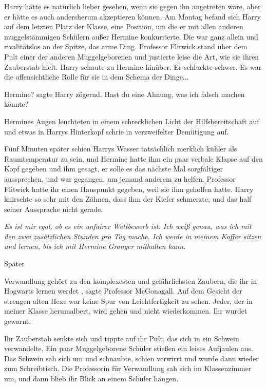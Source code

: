 Harry hätte es natürlich lieber gesehen, wenn sie gegen ihn angetreten wäre,
aber er hätte es auch andersherum akzeptieren können. Am Montag befand sich
Harry auf dem letzten Platz der Klasse, eine Position, um die er mit allen
anderen muggelstämmigen Schülern außer Hermine konkurrierte. Die war ganz allein
und rivalitätslos an der Spitze, das arme Ding. Professor Flitwick stand über
dem Pult einer der anderen Muggelgeborenen und justierte leise die Art, wie sie
ihren Zauberstab hielt. Harry schaute zu Hermine hinüber. Er schluckte schwer.
Es war die offensichtliche Rolle für sie in dem Schema der Dinge...

\glqq Hermine?\grqq{} sagte Harry zögernd. \glqq Hast du eine Ahnung, was ich
falsch machen könnte?\grqq{}

Hermines Augen leuchteten in einem schrecklichen Licht der Hilfsbereitschaft auf
und etwas in Harrys Hinterkopf schrie in verzweifelter Demütigung auf.

Fünf Minuten später schien Harrys Wasser tatsächlich merklich kühler als
Raumtemperatur zu sein, und Hermine hatte ihm ein paar verbale Klapse auf den
Kopf gegeben und ihm gesagt, er solle es das nächste Mal sorgfältiger
aussprechen, und war gegangen, um jemand anderem zu helfen. Professor Flitwick
hatte ihr einen Hauspunkt gegeben, weil sie ihm geholfen hatte. Harry knirschte
so sehr mit den Zähnen, dass ihm der Kiefer schmerzte, und das half seiner
Aussprache nicht gerade.

\emph{ Es ist mir egal, ob es ein unfairer Wettbewerb ist. Ich weiß genau, was
ich mit den zwei zusätzlichen Stunden pro Tag mache. Ich werde in meinem Koffer
sitzen und lernen, bis ich mit Hermine Granger mithalten kann. }

Später

\glqq Verwandlung gehört zu den komplexesten und gefährlichsten Zaubern, die ihr
in Hogwarts lernen werdet\grqq{} , sagte Professor McGonagall. Auf dem Gesicht
der strengen alten Hexe war keine Spur von Leichtfertigkeit zu sehen. \glqq
Jeder, der in meiner Klasse herumalbert, wird gehen und nicht wiederkommen. Ihr
wurdet gewarnt.\grqq{}

Ihr Zauberstab senkte sich und tippte auf ihr Pult, das sich in ein Schwein
verwandelte. Ein paar Muggelgeborene Schüler stießen ein leises Aufjaulen aus.
Das Schwein sah sich um und schnaubte, schien verwirrt und wurde dann wieder zum
Schreibtisch. Die Professorin für Verwandlung sah sich im Klassenzimmer um, und
dann blieb ihr Blick an einem Schüler hängen.

